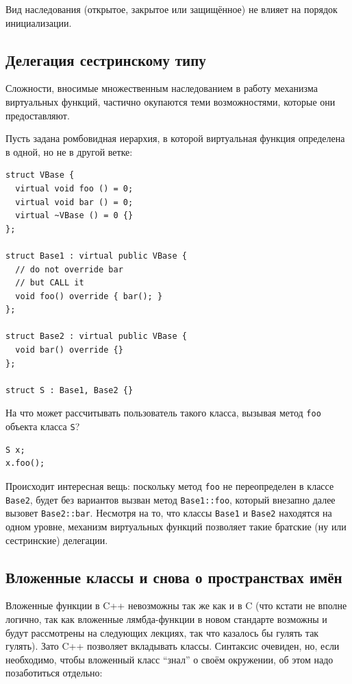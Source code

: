 \documentclass[a4paper,12pt,oneside]{book}
\begin{document}
Вид наследования (открытое, закрытое или защищённое) не влияет на порядок инициализации.

\subsection{Делегация сестринскому типу}

Сложности, вносимые множественным наследованием в работу механизма виртуальных функций, частично окупаются теми возможностями, которые они предоставляют.

Пусть задана ромбовидная иерархия, в которой виртуальная функция определена в одной, но не в другой ветке:

\begin{lstlisting}
struct VBase {
  virtual void foo () = 0;
  virtual void bar () = 0;
  virtual ~VBase () = 0 {}
};

struct Base1 : virtual public VBase {
  // do not override bar
  // but CALL it
  void foo() override { bar(); }  
};

struct Base2 : virtual public VBase {
  void bar() override {}
};

struct S : Base1, Base2 {}
\end{lstlisting}

На что может рассчитывать пользователь такого класса, вызывая метод \lstinline!foo! объекта класса \lstinline!S!?

\begin{lstlisting}
S x;
x.foo();
\end{lstlisting}

Происходит интересная вещь: поскольку метод \lstinline!foo! не переопределен в классе \lstinline!Base2!, будет без вариантов вызван метод \lstinline!Base1::foo!, который внезапно далее вызовет \lstinline!Base2::bar!. Несмотря на то, что классы \lstinline!Base1! и \lstinline!Base2! находятся на одном уровне, механизм виртуальных функций позволяет такие братские (ну или сестринские) делегации.

\subsection{Вложенные классы и снова о пространствах имён}\label{InnerClasses}

Вложенные функции в C++ невозможны так же как и в C (что кстати не вполне логично, так как вложенные лямбда-функции в новом стандарте возможны и будут рассмотрены на следующих лекциях, так что казалось бы гулять так гулять). Зато C++ позволяет вкладывать классы. Синтаксис очевиден, но, если необходимо, чтобы вложенный класс ``знал'' о своём окружении, об этом надо позаботиться отдельно:
\end{document}
